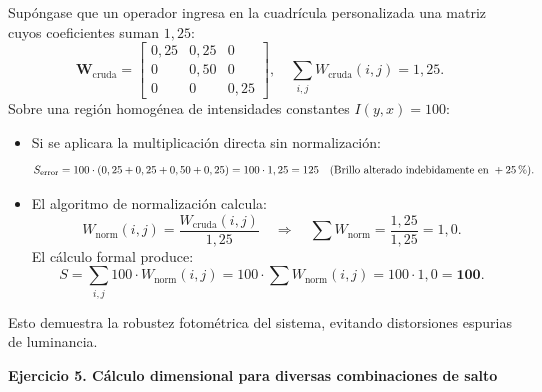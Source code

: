 \documentclass[11pt]{article}
\newcommand{\pct}{\ensuremath{\mathrm{\char37}}}
\begin{document}
Supóngase que un operador ingresa en la cuadrícula personalizada una matriz cuyos coeficientes suman $1,25$:
\begin{equation}
\mathbf{W}_{\text{cruda}} = \begin{bmatrix} 0,25 & 0,25 & 0 \\ 0 & 0,50 & 0 \\ 0 & 0 & 0,25 \end{bmatrix}, \quad \sum_{i, j} W_{\text{cruda}}(i, j) = 1,25.
\end{equation}
Sobre una región homogénea de intensidades constantes $I(y, x) = 100$:
\begin{itemize}[itemsep=0.2em]
\item Si se aplicara la multiplicación directa sin normalización:
\begin{equation}
S_{\text{error}} = 100 \cdot (0,25 + 0,25 + 0,50 + 0,25) = 100 \cdot 1,25 = 125 \quad (\text{Brillo alterado indebidamente en } +25\,\pct).
\end{equation}
\item El algoritmo de normalización calcula:
\begin{equation}
W_{\text{norm}}(i, j) = \frac{W_{\text{cruda}}(i, j)}{1,25} \quad\Rightarrow\quad \sum W_{\text{norm}} = \frac{1,25}{1,25} = 1,0.
\end{equation}
El cálculo formal produce:
\begin{equation}
S = \sum_{i, j} 100 \cdot W_{\text{norm}}(i, j) = 100 \cdot \sum W_{\text{norm}}(i, j) = 100 \cdot 1,0 = \mathbf{100}.
\end{equation}
\end{itemize}
Esto demuestra la robustez fotométrica del sistema, evitando distorsiones espurias de luminancia.

\textbf{Ejercicio 5. Cálculo dimensional para diversas combinaciones de salto}
\end{document}

